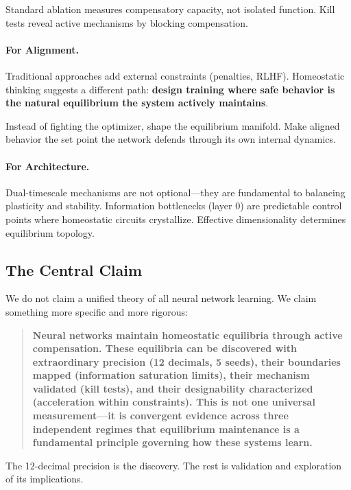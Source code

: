 Standard ablation measures compensatory capacity, not isolated function. Kill tests reveal active mechanisms by blocking compensation.

\paragraph{For Alignment.}
Traditional approaches add external constraints (penalties, RLHF). Homeostatic thinking suggests a different path: \textbf{design training where safe behavior is the natural equilibrium the system actively maintains}.

Instead of fighting the optimizer, shape the equilibrium manifold. Make aligned behavior the set point the network defends through its own internal dynamics.

\paragraph{For Architecture.}
Dual-timescale mechanisms are not optional—they are fundamental to balancing plasticity and stability. Information bottlenecks (layer 0) are predictable control points where homeostatic circuits crystallize. Effective dimensionality determines equilibrium topology.

\subsection{The Central Claim}

We do not claim a unified theory of all neural network learning. We claim something more specific and more rigorous:

\begin{quote}
\textbf{Neural networks maintain homeostatic equilibria through active compensation. These equilibria can be discovered with extraordinary precision (12 decimals, 5 seeds), their boundaries mapped (information saturation limits), their mechanism validated (kill tests), and their designability characterized (acceleration within constraints). This is not one universal measurement—it is convergent evidence across three independent regimes that equilibrium maintenance is a fundamental principle governing how these systems learn.}
\end{quote}

The 12-decimal precision is the discovery. The rest is validation and exploration of its implications.
